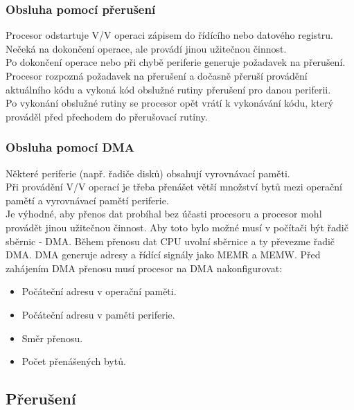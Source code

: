\subsubsection*{Obsluha pomocí přerušení}
Procesor odstartuje V/V operaci zápisem do řídícího nebo datového registru. \\
Nečeká na dokončení operace, ale provádí jinou užitečnou činnost.\\
Po dokončení operace nebo při chybě periferie generuje požadavek na přerušení.\\
Procesor rozpozná požadavek na přerušení a dočasně přeruší provádění aktuálního kódu a vykoná kód obslužné rutiny přerušení pro danou periferii. \\
Po vykonání obslužné rutiny se procesor opět vrátí k vykonávání kódu, který prováděl před přechodem do přerušovací rutiny.\\

\subsubsection*{Obsluha pomocí DMA}
Některé periferie (např. řadiče disků) obsahují vyrovnávací paměti.\\
Při provádění V/V operací je třeba přenášet větší množství bytů mezi operační pamětí a vyrovnávací pamětí periferie. \\
Je výhodné, aby přenos dat probíhal bez účasti procesoru a procesor mohl provádět jinou užitečnou činnost. Aby toto bylo možné musí v počítači být řadič sběrnic - DMA. Během přenosu dat CPU uvolní sběrnice a ty převezme řadič DMA. DMA generuje adresy a řídící signály jako MEMR a MEMW.
Před zahájením DMA přenosu musí procesor na DMA nakonfigurovat:
\begin{itemize}
    \item Počáteční adresu v operační paměti.
    \item Počáteční adresu v paměti periferie.
    \item Směr přenosu.
    \item Počet přenášených bytů.
\end{itemize}

\subsection{Přerušení}

